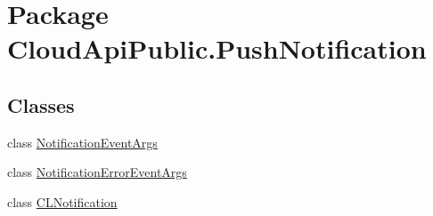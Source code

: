 \hypertarget{namespace_cloud_api_public_1_1_push_notification}{\section{Package Cloud\-Api\-Public.\-Push\-Notification}
\label{namespace_cloud_api_public_1_1_push_notification}
}
\subsection*{Classes}
\begin{DoxyCompactItemize}
\item 
class \hyperlink{class_cloud_api_public_1_1_push_notification_1_1_notification_event_args}{Notification\-Event\-Args}
\item 
class \hyperlink{class_cloud_api_public_1_1_push_notification_1_1_notification_error_event_args}{Notification\-Error\-Event\-Args}
\item 
class \hyperlink{class_cloud_api_public_1_1_push_notification_1_1_c_l_notification}{C\-L\-Notification}
\end{DoxyCompactItemize}
